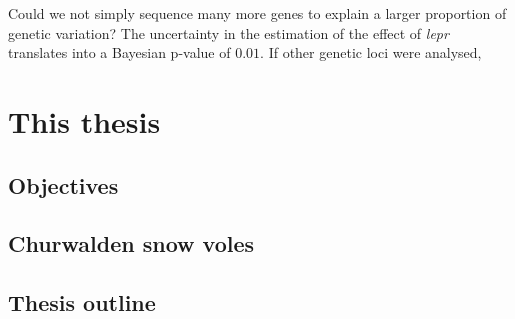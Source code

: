 Could we not simply sequence many more genes to explain a larger proportion of genetic variation?
The uncertainty in the estimation of the effect of \emph{lepr} translates into a Bayesian p-value of $0.01$. 
If other genetic loci were analysed, 


\section{This thesis}

\subsection{Objectives}

\subsection{Churwalden snow voles}

\subsection{Thesis outline}


